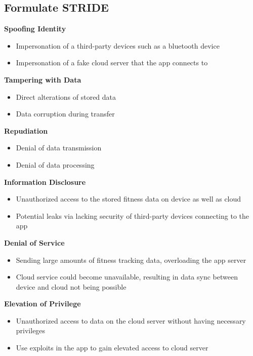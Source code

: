 \subsection{Formulate STRIDE}
\textbf{Spoofing Identity}
\begin{itemize}
  \item Impersonation of a third-party devices such as a bluetooth device
  \item Impersonation of a fake cloud server that the app connects to
\end{itemize}
\textbf{Tampering with Data}
\begin{itemize}
  \item Direct alterations of stored data
  \item Data corruption during transfer
\end{itemize}
\textbf{Repudiation}
\begin{itemize}
  \item Denial of data transmission
  \item Denial of data processing
\end{itemize}
\textbf{Information Disclosure}
\begin{itemize}
  \item Unauthorized access to the stored fitness data on device as well as cloud
  \item Potential leaks via lacking security of third-party devices connecting to the app
\end{itemize}
\textbf{Denial of Service}
\begin{itemize}
  \item Sending large amounts of fitness tracking data, overloading the app server
  \item Cloud service could become unavailable, resulting in data sync between device and cloud not being possible
\end{itemize}
\textbf{Elevation of Privilege}
\begin{itemize}
  \item Unauthorized access to data on the cloud server without having necessary privileges
  \item Use exploits in the app to gain elevated access to cloud server
\end{itemize}